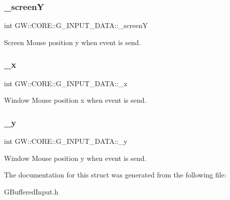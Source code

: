 \subsubsection{\texorpdfstring{\+\_\+screenY}{\_screenY}}
{\footnotesize\ttfamily int G\+W\+::\+C\+O\+R\+E\+::\+G\+\_\+\+I\+N\+P\+U\+T\+\_\+\+D\+A\+T\+A\+::\+\_\+screenY}

Screen Mouse position y when event is send. \hypertarget{struct_g_w_1_1_c_o_r_e_1_1_g___i_n_p_u_t___d_a_t_a_a9fc513214eaa8c49a48a8e6b71ec7637}{}\label{struct_g_w_1_1_c_o_r_e_1_1_g___i_n_p_u_t___d_a_t_a_a9fc513214eaa8c49a48a8e6b71ec7637} 
\subsubsection{\texorpdfstring{\+\_\+x}{\_x}}
{\footnotesize\ttfamily int G\+W\+::\+C\+O\+R\+E\+::\+G\+\_\+\+I\+N\+P\+U\+T\+\_\+\+D\+A\+T\+A\+::\+\_\+x}

Window Mouse position x when event is send. \hypertarget{struct_g_w_1_1_c_o_r_e_1_1_g___i_n_p_u_t___d_a_t_a_a1bad4a3cffe34efefab4315f3816938a}{}\label{struct_g_w_1_1_c_o_r_e_1_1_g___i_n_p_u_t___d_a_t_a_a1bad4a3cffe34efefab4315f3816938a} 
\subsubsection{\texorpdfstring{\+\_\+y}{\_y}}
{\footnotesize\ttfamily int G\+W\+::\+C\+O\+R\+E\+::\+G\+\_\+\+I\+N\+P\+U\+T\+\_\+\+D\+A\+T\+A\+::\+\_\+y}

Window Mouse position y when event is send. 

The documentation for this struct was generated from the following file\+:\begin{DoxyCompactItemize}
\item 
G\+Buffered\+Input.\+h\end{DoxyCompactItemize}
